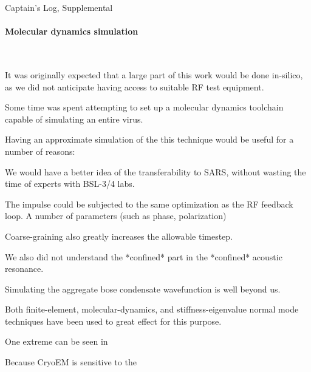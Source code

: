 \documentclass[paper.tex]{subfiles}
\begin{document}
\clearpage
{\Huge Captain's Log, Supplemental}\\




\paragraph{Molecular dynamics simulation}
\

It was originally expected that a large part of this work would be done in-silico, as we did not anticipate having access to suitable RF test equipment. 

Some time was spent attempting to set up a molecular dynamics toolchain capable of simulating an entire virus. 

Having an approximate simulation of the this technique would be useful for a number of reasons: 

We would have a better idea of the transferability to SARS, without wasting the time of experts with BSL-3/4 labs.

The impulse could be subjected to the same optimization as the RF feedback loop. A number of parameters (such as phase, polarization)



Coarse-graining also greatly increases the allowable timestep.

We also did not understand the *confined* part in the *confined* acoustic resonance.

Simulating the aggregate bose condensate wavefunction is well beyond us.


Both finite-element, molecular-dynamics, and stiffness-eigenvalue normal mode techniques have been used to great effect for this purpose. 








One extreme can be seen in 

Because CryoEM is sensitive to the 
\end{document}
